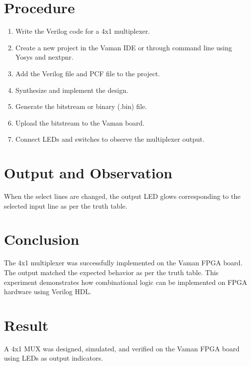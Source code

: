 \documentclass[a4paper,12pt]{article}
\begin{document}
\section*{Procedure}
\begin{enumerate}
    \item Write the Verilog code for a 4x1 multiplexer.
    \item Create a new project in the Vaman IDE or through command line using Yosys and nextpnr.
    \item Add the Verilog file and PCF file to the project.
    \item Synthesize and implement the design.
    \item Generate the bitstream or binary (.bin) file.
    \item Upload the bitstream to the Vaman board.
    \item Connect LEDs and switches to observe the multiplexer output.
\end{enumerate}

\section*{Output and Observation}
When the select lines are changed, the output LED glows corresponding to the selected input line as per the truth table.

\section*{Conclusion}
The 4x1 multiplexer was successfully implemented on the Vaman FPGA board. The output matched the expected behavior as per the truth table. This experiment demonstrates how combinational logic can be implemented on FPGA hardware using Verilog HDL.

\section*{Result}
A 4x1 MUX was designed, simulated, and verified on the Vaman FPGA board using LEDs as output indicators.
\end{document}
